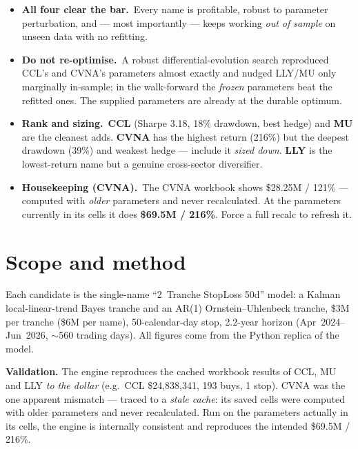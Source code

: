 \documentclass[11pt]{article}
\newcommand{\kpi}[2]{\textbf{#1}\,{\footnotesize\color{bcgrey}#2}}
\begin{document}
\begin{itemize}[leftmargin=1.4em,itemsep=2pt]
  \item \kpi{All four clear the bar.}{} Every name is profitable, robust to parameter
        perturbation, and --- most importantly --- keeps working \emph{out of sample} on unseen
        data with no refitting.
  \item \kpi{Do not re-optimise.}{} A robust differential-evolution search reproduced CCL's and
        CVNA's parameters almost exactly and nudged LLY/MU only marginally in-sample; in the
        walk-forward the \emph{frozen} parameters beat the refitted ones. The supplied parameters
        are already at the durable optimum.
  \item \kpi{Rank and sizing.}{} \textbf{CCL} (Sharpe 3.18, 18\% drawdown, best hedge) and
        \textbf{MU} are the cleanest adds. \textbf{CVNA} has the highest return (216\%) but the
        deepest drawdown (39\%) and weakest hedge --- include it \emph{sized down}. \textbf{LLY}
        is the lowest-return name but a genuine cross-sector diversifier.
  \item \kpi{Housekeeping (CVNA).}{} The CVNA workbook shows \$28.25M / 121\% --- computed with
        \emph{older} parameters and never recalculated. At the parameters currently in its cells
        it does \textbf{\$69.5M / 216\%}. Force a full recalc to refresh it.
\end{itemize}

\section{Scope and method}

Each candidate is the single-name ``2~Tranche StopLoss 50d'' model: a Kalman local-linear-trend
Bayes tranche and an AR(1) Ornstein--Uhlenbeck tranche, \$3M per tranche (\$6M per name),
50-calendar-day stop, 2.2-year horizon (Apr~2024--Jun~2026, $\sim$560 trading days). All figures
come from the Python replica of the model.

\textbf{Validation.} The engine reproduces the cached workbook results of CCL, MU and LLY
\emph{to the dollar} (e.g.\ CCL \$24{,}838{,}341, 193 buys, 1 stop). CVNA was the one apparent
mismatch --- traced to a \emph{stale cache}: its saved cells were computed with older parameters
and never recalculated. Run on the parameters actually in its cells, the engine is internally
consistent and reproduces the intended \$69.5M / 216\%.
\end{document}
